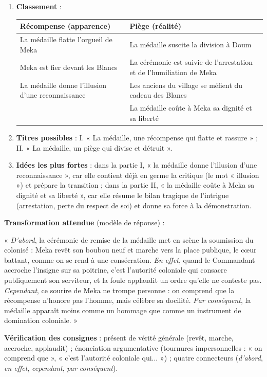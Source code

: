 \documentclass[11pt]{article}
\begin{document}
\begin{corrige}
\begin{enumerate}
\item \textbf{Classement} :
\begin{center}
\begin{tabularx}{\linewidth}{|X|X|}
\hline
\rowcolor{popblueL} \textbf{Récompense (apparence)} & \textbf{Piège (réalité)} \\
\hline
La médaille flatte l'orgueil de Meka & La médaille suscite la division à Doum \\
\hline
Meka est fier devant les Blancs & La cérémonie est suivie de l'arrestation et de l'humiliation de Meka \\
\hline
La médaille donne l'illusion d'une reconnaissance & Les anciens du village se méfient du cadeau des Blancs \\
\hline
& La médaille coûte à Meka sa dignité et sa liberté \\
\hline
\end{tabularx}
\end{center}
\item \textbf{Titres possibles} : I. « La médaille, une récompense qui flatte et rassure » ; II. « La médaille, un piège qui divise et détruit ».
\item \textbf{Idées les plus fortes} : dans la partie I, « la médaille donne l'illusion d'une reconnaissance », car elle contient déjà en germe la critique (le mot « illusion ») et prépare la transition ; dans la partie II, « la médaille coûte à Meka sa dignité et sa liberté », car elle résume le bilan tragique de l'intrigue (arrestation, perte du respect de soi) et donne sa force à la démonstration.
\end{enumerate}
\end{corrige}

\begin{corrige}
\textbf{Transformation attendue} (modèle de réponse) :

« \emph{D'abord}, la cérémonie de remise de la médaille met en scène la soumission du colonisé : Meka revêt son boubou neuf et marche vers la place publique, le cœur battant, comme on se rend à une consécration. \emph{En effet}, quand le Commandant accroche l'insigne sur sa poitrine, c'est l'autorité coloniale qui consacre publiquement son serviteur, et la foule applaudit un ordre qu'elle ne conteste pas. \emph{Cependant}, ce sourire de Meka ne trompe personne : on comprend que la récompense n'honore pas l'homme, mais célèbre sa docilité. \emph{Par conséquent}, la médaille apparaît moins comme un hommage que comme un instrument de domination coloniale. »

\textbf{Vérification des consignes} : présent de vérité générale (revêt, marche, accroche, applaudit) ; énonciation argumentative (tournures impersonnelles : « on comprend que », « c'est l'autorité coloniale qui... ») ; quatre connecteurs (\emph{d'abord}, \emph{en effet}, \emph{cependant}, \emph{par conséquent}).
\end{corrige}
\end{document}
